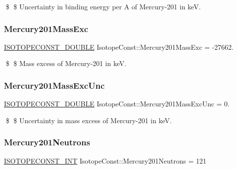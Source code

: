 \$ \$ Uncertainty in binding energy per A of Mercury-\/201 in keV. \mbox{\label{group___isotope_const-_mercury-_hg201_ga72875278baee3f2c52f011faabbb351b}} 
\subsubsection{\texorpdfstring{Mercury201\+Mass\+Exc}{Mercury201MassExc}}
{\footnotesize\ttfamily \mbox{\hyperlink{group___isotope_const-_macros_ga8f45a7272ce02c0b4c65c44636ed719a}{I\+S\+O\+T\+O\+P\+E\+C\+O\+N\+S\+T\+\_\+\+D\+O\+U\+B\+LE}} Isotope\+Const\+::\+Mercury201\+Mass\+Exc = -\/27662.}

\$ \$ Mass excess of Mercury-\/201 in keV. \mbox{\label{group___isotope_const-_mercury-_hg201_ga3e632a2bb6d003951c5b14b2f53b088f}} 
\subsubsection{\texorpdfstring{Mercury201\+Mass\+Exc\+Unc}{Mercury201MassExcUnc}}
{\footnotesize\ttfamily \mbox{\hyperlink{group___isotope_const-_macros_ga8f45a7272ce02c0b4c65c44636ed719a}{I\+S\+O\+T\+O\+P\+E\+C\+O\+N\+S\+T\+\_\+\+D\+O\+U\+B\+LE}} Isotope\+Const\+::\+Mercury201\+Mass\+Exc\+Unc = 0.}

\$ \$ Uncertainty in mass excess of Mercury-\/201 in keV. \mbox{\label{group___isotope_const-_mercury-_hg201_ga1f83f67abf0c6c0d53a944cc51497bbb}} 
\subsubsection{\texorpdfstring{Mercury201\+Neutrons}{Mercury201Neutrons}}
{\footnotesize\ttfamily \mbox{\hyperlink{group___isotope_const-_macros_ga5f18360b3e99483a35c32d789e62621c}{I\+S\+O\+T\+O\+P\+E\+C\+O\+N\+S\+T\+\_\+\+I\+NT}} Isotope\+Const\+::\+Mercury201\+Neutrons = 121}


